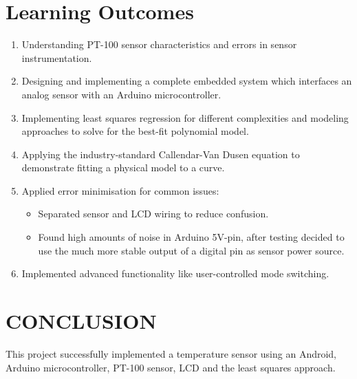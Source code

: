 \documentclass{article}
\begin{document}
\section*{Learning Outcomes}
\begin{enumerate}
    \item Understanding PT-100 sensor characteristics and errors in sensor instrumentation.
    \item Designing and implementing a complete embedded system which interfaces an analog sensor with an Arduino microcontroller.
    \item Implementing least squares regression for different complexities and modeling approaches to solve for the best-fit polynomial model.
    \item Applying the industry-standard Callendar-Van Dusen equation to demonstrate fitting a physical model to a curve.
    \item Applied error minimisation for common issues:
    \begin{itemize}
        \item Separated sensor and LCD wiring to reduce confusion.
        \item Found high amounts of noise in Arduino 5V-pin, after testing decided to use the much more stable output of a digital pin as sensor power source.
    \end{itemize}
    \item Implemented advanced functionality like user-controlled mode switching.
\end{enumerate}

\section*{CONCLUSION}
This project successfully implemented a temperature sensor using an Android, Arduino microcontroller, PT-100 sensor, LCD and the least squares approach.
\end{document}
